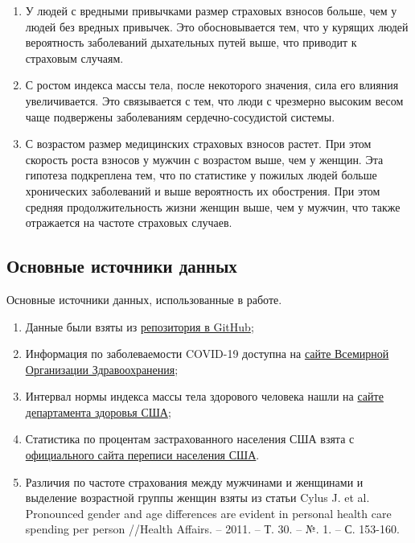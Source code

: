 \documentclass[a4paper,12pt]{article}
\begin{document}
\begin{enumerate}
	\item У людей с вредными привычками размер страховых взносов больше, чем у людей без вредных привычек. Это обосновывается тем, что у курящих людей вероятность заболеваний дыхательных путей выше, что приводит к страховым случаям.
	
	\item С ростом индекса массы тела, после некоторого значения, сила его влияния увеличивается. Это связывается с тем, что люди с чрезмерно высоким весом чаще подвержены заболеваниям сердечно-сосудистой системы. 
	
	\item С возрастом размер медицинских страховых взносов растет. При этом скорость роста взносов у мужчин с возрастом выше, чем у женщин. Эта гипотеза подкреплена тем, что по статистике у пожилых людей больше хронических заболеваний и выше вероятность их обострения. При этом средняя продолжительность жизни женщин выше, чем у мужчин, что также отражается на частоте страховых случаев.
\end{enumerate}

\subsection{Основные источники данных}
Основные источники данных, использованные в работе.
\begin{enumerate}
	\item Данные были взяты из \href{https://github.com/stedy/Machine-Learning-with-R-datasets/blob/master/insurance.csv}{репозитория в GitHub};
	\item Информация по заболеваемости COVID-19 доступна на \href{https://covid19.who.int/}{сайте Всемирной Организации Здравоохранения};
	\item Интервал нормы индекса массы тела здорового человека нашли на  \href{https://www.cdc.gov/healthyweight/assessing/bmi/adult_bmi/index.html}{сайте департамента здоровья США};
	\item Статистика по процентам застрахованного населения США взята с \href{https://www.census.gov/library/publications/2019/demo/p60-267.html#:~:text=The%20percentage%20of%20people%20with,in%202017%20(92.1%20percent).}{официального сайта переписи населения США}.
	\item Различия по частоте страхования между мужчинами и женщинами и выделение возрастной группы женщин взяты из статьи Cylus J. et al. Pronounced gender and age differences are evident in personal health care spending per person //Health Affairs. – 2011. – Т. 30. – №. 1. – С. 153-160.
	
\end{enumerate}
\end{document}
